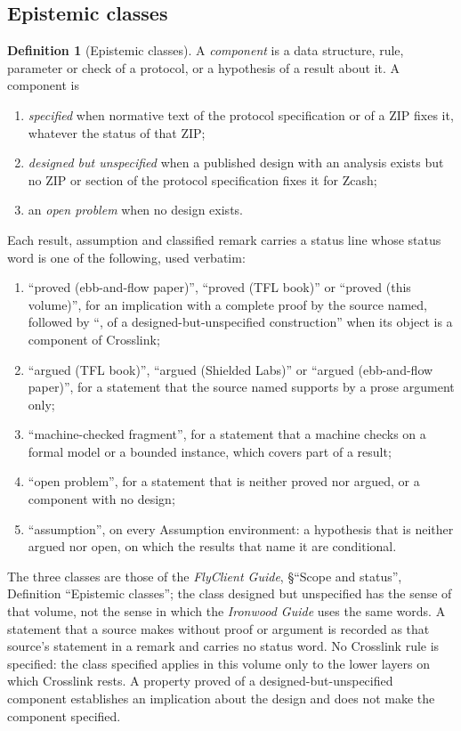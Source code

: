 \documentclass[11pt,a4paper]{article}
\theoremstyle{definition}
\newtheorem{definition}[theorem]{Definition}
\begin{document}
\subsection{Epistemic classes}\label{sec:intro-classes}

\begin{definition}[Epistemic classes]\label{def:classes}
A \emph{component} is a data structure, rule, parameter or check of a
protocol, or a hypothesis of a result about it. A component is
\begin{enumerate}[label=(\roman*)]
\item \emph{specified} when normative text of the protocol specification or
  of a ZIP fixes it, whatever the status of that ZIP;
\item \emph{designed but unspecified} when a published design with an
  analysis exists but no ZIP or section of the protocol specification fixes
  it for Zcash;
\item an \emph{open problem} when no design exists.
\end{enumerate}
Each result, assumption and classified remark carries a status line whose
status word is one of the following, used verbatim:
\begin{enumerate}[label=(\alph*)]
\item ``proved (ebb-and-flow paper)'', ``proved (TFL book)'' or ``proved (this
  volume)'', for an implication with a complete proof by the source named,
  followed by ``, of a designed-but-unspecified construction'' when its
  object is a component of Crosslink;
\item ``argued (TFL book)'', ``argued (Shielded Labs)'' or ``argued
  (ebb-and-flow paper)'', for a statement that the source named supports by a
  prose argument only;
\item ``machine-checked fragment'', for a statement that a machine checks on a
  formal model or a bounded instance, which covers part of a result;
\item ``open problem'', for a statement that is neither proved nor argued, or
  a component with no design;
\item ``assumption'', on every Assumption environment: a hypothesis that is
  neither argued nor open, on which the results that name it are
  conditional.
\end{enumerate}
\end{definition}

The three classes are those of the \emph{FlyClient Guide}, \S``Scope and
status'', Definition ``Epistemic classes''; the class designed but
unspecified has the sense of that volume, not the sense in which the
\emph{Ironwood Guide} uses the same words. A statement that a source makes
without proof or argument is recorded as that source's statement in a remark
and carries no status word. No Crosslink rule is specified: the class
specified applies in this volume only to the lower layers on which Crosslink
rests. A property proved of a designed-but-unspecified component establishes
an implication about the design and does not make the component specified.
\end{document}
